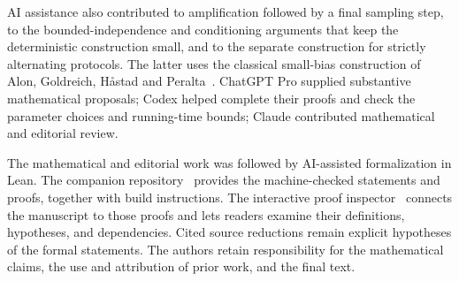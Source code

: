 \documentclass[11pt,letterpaper]{article} \usepackage[utf8]{inputenc}
\theoremstyle{plain} \newtheorem{theorem}{Theorem}[section]
\theoremstyle{definition} \newaliascnt{definition}{theorem}
\begin{document}
AI assistance also contributed to amplification followed by a final
sampling step, to the bounded-independence and conditioning arguments
that keep the deterministic construction small, and to the separate
construction for strictly alternating protocols. The latter uses the
classical small-bias construction of Alon, Goldreich, H{\aa}stad and
Peralta~\cite{alon1992smallbias}. ChatGPT Pro supplied substantive
mathematical proposals; Codex helped complete their proofs and check the
parameter choices and running-time bounds; Claude contributed
mathematical and editorial review.

The mathematical and editorial work was followed by AI-assisted
formalization in Lean. The companion repository~\cite{interlacing2026lean}
provides the machine-checked statements and proofs, together with build
instructions. The interactive proof inspector~\cite{interlacing2026inspector}
connects the manuscript to those proofs and lets readers examine their
definitions, hypotheses, and dependencies. Cited source reductions remain
explicit hypotheses of the formal statements. The authors retain
responsibility for the mathematical claims, the use and attribution of
prior work, and the final text.






\end{document}
